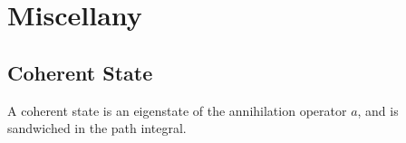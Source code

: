 \documentclass{article}
\begin{document}
\section{Miscellany}

\subsection{Coherent State}

A coherent state is an eigenstate of the annihilation operator $a$, and is sandwiched in the path integral.

% 
% 
\end{document}
